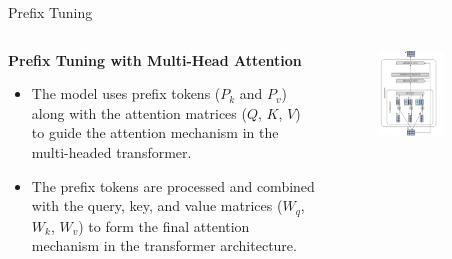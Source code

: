 \documentclass[serif, aspectratio=169]{beamer}
\begin{document}
\begin{frame}{Prefix Tuning}
    \begin{columns}
        \begin{column}{0.5\textwidth}
            \textbf{Prefix Tuning with Multi-Head Attention}
            \begin{itemize}
                \item The model uses prefix tokens (\( P_k \) and \( P_v \)) along with the attention matrices (\( Q \), \( K \), \( V \)) to guide the attention mechanism in the multi-headed transformer.
                \vspace{0.3cm}
                \item The prefix tokens are processed and combined with the query, key, and value matrices (\( W_q \), \( W_k \), \( W_v \)) to form the final attention mechanism in the transformer architecture.
            \end{itemize}
        \end{column}

        \begin{column}{0.5\textwidth}
            \begin{figure}
            \centering
            \includegraphics[width=0.7\textwidth]{pic/Prefix tuning1.PNG}
            \end{figure}
        \end{column}

    \end{columns}
\end{frame}
\end{document}
